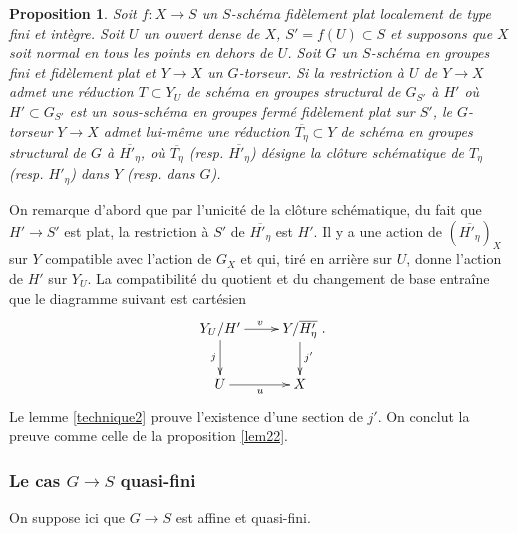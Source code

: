 \documentclass[11pt]{amsart}
\numberwithin{equation}{section}
\newtheorem{prop}[thm]{Proposition}
\theoremstyle{definition}
\theoremstyle{remark}
\begin{document}
\begin{prop}\label{lemCARFIN} Soit $f:X\to S$ un $S$-sch\'ema fid\`element plat localement de type fini et int\`egre. Soit $U$ un ouvert dense de $X$, $S'=f(U)\subset S$ et supposons que $X$ soit normal en tous les points en dehors de $U$. Soit $G$ un $S$-sch\'ema en groupes fini et fid\`element plat et $Y \to X$ un $G$-torseur. Si la restriction \`a $U$ de $Y \to X$ admet une r\'eduction $T \subset Y_U$ de sch\'ema en groupes structural de $G_{S'}$ \`a $H'$ o\`u $H' \subset G_{S'}$ est un sous-sch\'ema en groupes ferm\'e fid\`element plat sur $S'$, le $G$-torseur $Y\to X$ admet lui-m\^eme une r\'eduction $\overline {T_\eta } \subset Y$ de sch\'ema en groupes structural de $G$ \`a $ \overline {H'_\eta }$, o\`u $\overline {T_\eta }$ (resp. $\overline {H' _\eta }$) d\'esigne la cl\^oture sch\'ematique de $T_\eta $ (resp. $H'_\eta $) dans $Y$ (resp. dans $G$).\end{prop}


\proof On remarque d'abord que par l'unicit\'e de la cl\^oture sch\'ematique, du fait que $H' \to S'$ est plat, la restriction \`a $S'$ de $\overline{ H'_\eta }$ est $H'$. Il y a une action de $(\overline {H'_\eta} )_X$ sur $Y$ compatible avec l'action de $G_X$ et qui, tir\'e en arri\`ere sur $U$, donne l'action de $H'$ sur $Y_U$. La compatibilit\'e du quotient et du changement de base entra\^ine que le diagramme suivant est cart\'esien
$$\xymatrix{
Y_U /H' \ar[r]^v \ar[d]_j &Y/\overline {H'_\eta }\ar[d]^{j'} \\
U \ar[r]_u &X\\
}.$$
Le lemme \ref{technique2} prouve l'existence d'une section de $j'$. On conclut la preuve comme celle de la proposition \ref{lem22}. \endproof




\subsubsection{Le cas $G \to S$ quasi-fini}

On suppose ici que $G\to S$ est affine et quasi-fini.
\end{document}
